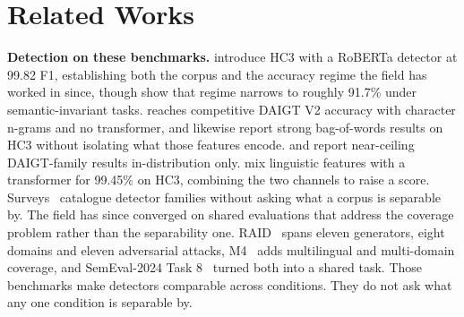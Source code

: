 \documentclass[conference,a4paper]{IEEEtran}
\begin{document}
\section{Related Works}
\label{sec:related}

\textbf{Detection on these benchmarks.} \citet{Guo2023close} introduce HC3 with a RoBERTa detector at 99.82 F1, establishing both the corpus and the accuracy regime the field has worked in since, though \citet{Su2023plus} show that regime narrows to roughly 91.7\% under semantic-invariant tasks. \citet{Zhou2024exploiting} reaches competitive DAIGT V2 accuracy with character n-grams and no transformer, and \citet{Kubrusly2025detecting} likewise report strong bag-of-words results on HC3 without isolating what those features encode. \citet{Ansary2026multirepresentation} and \citet{Lamsiyah2025daigt} report near-ceiling DAIGT-family results in-distribution only. \citet{Annepaka2026synergizing} mix linguistic features with a transformer for 99.45\% on HC3, combining the two channels to raise a score. Surveys~\cite{Crothers2023machine} catalogue detector families without asking what a corpus is separable by. The field has since converged on shared evaluations that address the coverage problem rather than the separability one. RAID~\cite{Dugan2024raid} spans eleven generators, eight domains and eleven adversarial attacks, M4~\cite{Wang2024m4} adds multilingual and multi-domain coverage, and SemEval-2024 Task 8~\cite{Wang2024semeval} turned both into a shared task. Those benchmarks make detectors comparable across conditions. They do not ask what any one condition is separable by.
\end{document}
